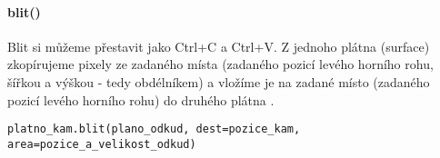 \paragraph{blit()}
Blit si můžeme přestavit jako Ctrl+C a Ctrl+V. Z jednoho plátna (surface) zkopírujeme pixely ze zadaného místa (zadaného pozicí levého horního rohu, šířkou a výškou - tedy obdélníkem)  a vložíme je na zadané místo (zadaného pozicí levého horního rohu) do druhého plátna .\\
\begin{code}
\begin{verbatim}
platno_kam.blit(plano_odkud, dest=pozice_kam, area=pozice_a_velikost_odkud)
\end{verbatim}
\end{code}

